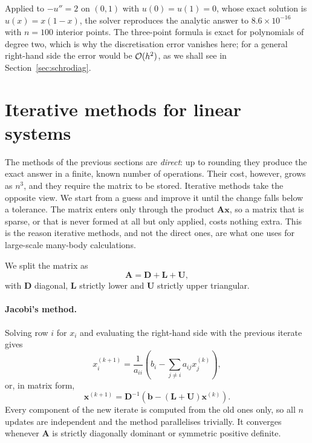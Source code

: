 Applied to $-u''=2$ on $(0,1)$ with $u(0)=u(1)=0$, whose exact solution is
$u(x)=x(1-x)$, the solver reproduces the analytic answer to
$8.6\times 10^{-16}$ with $n=100$ interior points.  The three-point formula is
exact for polynomials of degree two, which is why the discretisation error
vanishes here; for a general right-hand side the error would be
$\mathcal{O}(h^2)$, as we shall see in Section~\ref{sec:schrodiag}.

\section{Iterative methods for linear systems}
\label{sec:iterative}

The methods of the previous sections are \emph{direct}: up to rounding they
produce the exact answer in a finite, known number of operations.  Their cost,
however, grows as $n^3$, and they require the matrix to be stored.  Iterative
methods take the opposite view.  We start from a guess and improve it until
the change falls below a tolerance.  The matrix enters only through the
product $\bm{A}\bm{x}$, so a matrix that is sparse, or that is never formed at
all but only applied, costs nothing extra.  This is the reason iterative
methods, and not the direct ones, are what one uses for large-scale many-body
calculations.

We split the matrix as
\begin{equation}
  \bm{A} = \bm{D} + \bm{L} + \bm{U},
  \label{eq:1-splitting}
\end{equation}
with $\bm{D}$ diagonal, $\bm{L}$ strictly lower and $\bm{U}$ strictly upper
triangular.

\paragraph{Jacobi's method.}
Solving row $i$ for $x_i$ and evaluating the right-hand side with the previous
iterate gives
\begin{equation}
  x_i^{(k+1)} = \frac{1}{a_{ii}}
     \left(b_i - \sum_{j\ne i} a_{ij} x_j^{(k)}\right),
  \label{eq:1-jacobi}
\end{equation}
or, in matrix form,
\begin{equation}
  \bm{x}^{(k+1)} = \bm{D}^{-1}
      \left(\bm{b}-(\bm{L}+\bm{U})\bm{x}^{(k)}\right).
  \label{eq:1-jacobimat}
\end{equation}
Every component of the new iterate is computed from the old ones only, so all
$n$ updates are independent and the method parallelises trivially.  It
converges whenever $\bm{A}$ is strictly diagonally dominant or symmetric
positive definite.

